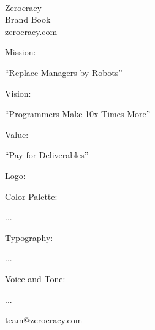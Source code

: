 \documentclass{article}
\date{\today}
\newcommand\slide[1]{%
  \pagebreak\topskip0pt\vspace*{\fill}%
  \begin{center}\Huge%
  #1
  \end{center}%
  \vspace*{\fill}}
\begin{document}
\setlength{\parindent}{0pt} %

\sffamily


\slide{%
  \\
  Zerocracy
  \\[1em]
  \large
  Brand Book\\
  \href{https://www.zerocracy.com}{zerocracy.com}}

\slide{
  Mission:
  \par
  \enquote{Replace Managers by Robots}}

\slide{
  Vision:
  \par
  \enquote{Programmers Make 10x Times More}}

\slide{
  Value:
  \par
  \enquote{Pay for Deliverables}}

\slide{
  Logo:
  \par
  }

\slide{
  Color Palette:
  \par
  ...}

\slide{
  Typography:
  \par
  ...}

\slide{
  Voice and Tone:
  \par
  ...}

\slide{%
  \href{mailto:team@zerocracy.com}{team@zerocracy.com}}
\end{document}
